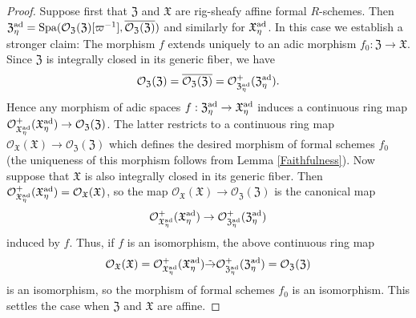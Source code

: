 \documentclass[12pt,twoside,a4paper]{article}
\theoremstyle{definition}
\theoremstyle{remark}
\newcommand\ad{{\rm ad}}
\newcommand\Spa{{\rm Spa}}
\begin{document}
\begin{proof}Suppose first that $\mathfrak{Z}$ and $\mathfrak{X}$ are rig-sheafy affine formal $R$-schemes. Then $\mathfrak{Z}_{\eta}^{\ad}=\Spa(\mathcal{O}_{\mathfrak{Z}}(\mathfrak{Z})[\varpi^{-1}], \overline{\mathcal{O}_{\mathfrak{Z}}(\mathfrak{Z})})$ and similarly for $\mathfrak{X}_{\eta}^{\ad}$. In this case we establish a stronger claim: The morphism $f$ extends uniquely to an adic morphism $f_{0}: \mathfrak{Z}\to\mathfrak{X}$. Since $\mathfrak{Z}$ is integrally closed in its generic fiber, we have \begin{equation*}\mathcal{O}_{\mathfrak{Z}}(\mathfrak{Z})=\overline{\mathcal{O}_{\mathfrak{Z}}(\mathfrak{Z})}=\mathcal{O}_{\mathfrak{Z}_{\eta}^{\ad}}^{+}(\mathfrak{Z}_{\eta}^{\ad}).\end{equation*}Hence any morphism of adic spaces $f: \mathfrak{Z}_{\eta}^{\ad}\to \mathfrak{X}_{\eta}^{\ad}$ induces a continuous ring map $\mathcal{O}_{\mathfrak{X}_{\eta}^{\ad}}^{+}(\mathfrak{X}_{\eta}^{\ad})\to \mathcal{O}_{\mathfrak{Z}}(\mathfrak{Z})$. The latter restricts to a continuous ring map $\mathcal{O}_{\mathfrak{X}}(\mathfrak{X})\to \mathcal{O}_{\mathfrak{Z}}(\mathfrak{Z})$ which defines the desired morphism of formal schemes $f_{0}$ (the uniqueness of this morphism follows from Lemma \ref{Faithfulness}). Now suppose that $\mathfrak{X}$ is also integrally closed in its generic fiber. Then $\mathcal{O}_{\mathfrak{X}_{\eta}^{\ad}}^{+}(\mathfrak{X}_{\eta}^{\ad})=\mathcal{O}_{\mathfrak{X}}(\mathfrak{X})$, so the map $\mathcal{O}_{\mathfrak{X}}(\mathfrak{X})\to \mathcal{O}_{\mathfrak{Z}}(\mathfrak{Z})$ is the canonical map \begin{equation*}\mathcal{O}_{\mathfrak{X}_{\eta}^{\ad}}^{+}(\mathfrak{X}_{\eta}^{\ad})\to \mathcal{O}_{\mathfrak{Z}_{\eta}^{\ad}}^{+}(\mathfrak{Z}_{\eta}^{\ad})\end{equation*}induced by $f$. Thus, if $f$ is an isomorphism, the above continuous ring map\begin{equation*}\mathcal{O}_{\mathfrak{X}}(\mathfrak{X})=\mathcal{O}_{\mathfrak{X}_{\eta}^{\ad}}^{+}(\mathfrak{X}_{\eta}^{\ad})\tilde{\to} \mathcal{O}_{\mathfrak{Z}_{\eta}^{\ad}}^{+}(\mathfrak{Z}_{\eta}^{\ad})=\mathcal{O}_{\mathfrak{Z}}(\mathfrak{Z})\end{equation*}is an isomorphism, so the morphism of formal schemes $f_{0}$ is an isomorphism. This settles the case when $\mathfrak{Z}$ and $\mathfrak{X}$ are affine.


\end{proof}
\end{document}

